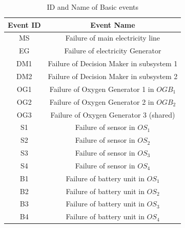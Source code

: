 \documentclass[10pt]{llncs}
\begin{document}
   	 

\begin{table}[thpb]
\renewcommand{\arraystretch}{1.5}
\caption{ID and Name of Basic events}
\label{table1}
\centering
\begin{tabular}{c   c}
\hline
\bfseries Event ID & \bfseries Event Name\\
\hline
MS & Failure of main electricity line\\
EG & Failure of electricity Generator\\
DM1 & Failure of Decision Maker in subsystem 1\\
DM2 & Failure of Decision Maker in subsystem 2\\
OG1 & Failure of Oxygen Generator 1 in ${OGB}_1$\\
OG2 & Failure of Oxygen Generator 2 in ${OGB}_2$\\
OG3 & Failure of Oxygen Generator 3 (shared)\\
S1 & Failure of sensor in $OS_1$\\
S2 & Failure of sensor in $OS_2$\\
S3 & Failure of sensor in $OS_3$\\
S4 & Failure of sensor in $OS_4$\\
B1 & Failure of battery unit in $OS_1$\\
B2 & Failure of battery unit in $OS_2$\\
B3 & Failure of battery unit in $OS_3$\\
B4 & Failure of battery unit in $OS_4$\\
\hline
\end{tabular}
\end{table}
\end{document}
